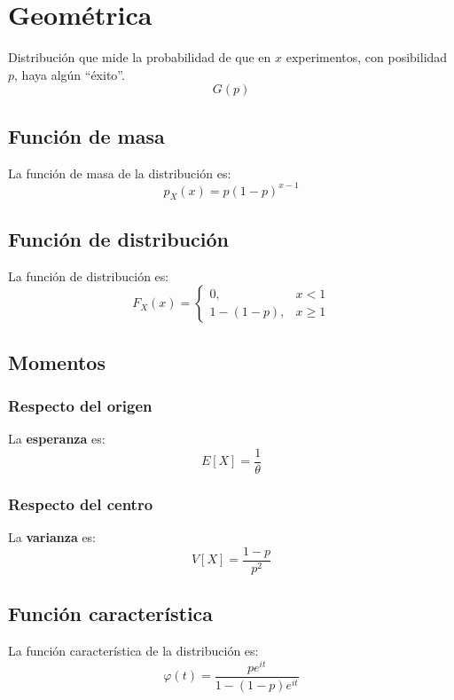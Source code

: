 \section{Geométrica}
\label{sec:geometrica}
Distribución que mide la probabilidad de que en $x$ experimentos, con posibilidad
$p$, haya algún ``éxito''.
\[
\boxed{G\left( p \right)}
\]

\subsection{Función de masa}
La función de masa de la distribución es:
\[
p_X \left( x \right) = p \left( 1 - p \right)^{x - 1} 
\]

\subsection{Función de distribución}
La función de distribución es:
\[
F_X\left( x \right) = \begin{cases}
    0, &x < 1\\ 
    1 - \left( 1 - p \right), &x \ge 1
\end{cases}
\]

\subsection{Momentos}

\subsubsection*{Respecto del origen}
La \textbf{esperanza} es: 
\[
    E\left[ X \right] = \frac{1}{\theta} 
\]
\subsubsection*{Respecto del centro}
La \textbf{varianza} es:
\[
    V\left[ X \right] = \frac{1 - p}{p^2}
\]

\subsection{Función característica}
La función característica de la distribución es:
\[
\varphi\left( t \right) = \frac{p e^{it}}{1 - \left( 1 - p \right)e^{it}}
\]


